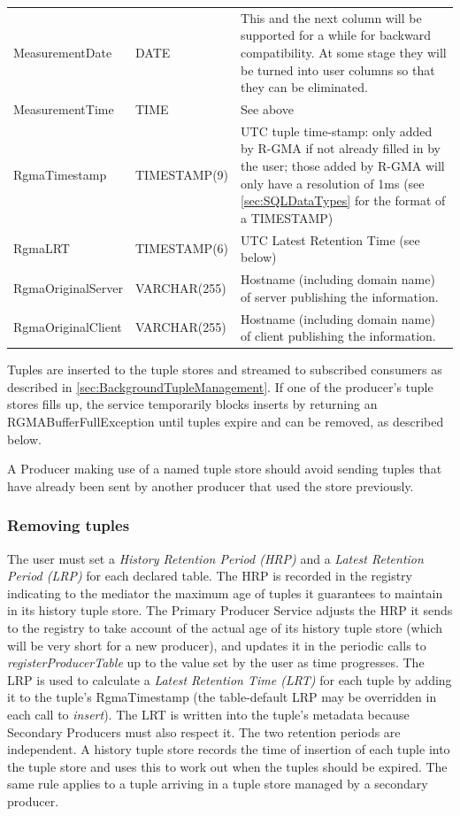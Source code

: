 \bigskip\begin{tabular}{llp{95mm}}
MeasurementDate&DATE&This and the next column will be supported for a while for
backward compatibility. At some stage they will be turned into user columns so
that they can be eliminated.\\
MeasurementTime&TIME&See above\\
RgmaTimestamp&TIMESTAMP(9)&
UTC tuple time-stamp: only added by R-GMA if not already filled in by the user;
those added by R-GMA will only have a resolution of 1ms
(see \ref{sec:SQLDataTypes} for the format of a TIMESTAMP)\\
RgmaLRT&TIMESTAMP(6)&
UTC Latest Retention Time (see below)\\
RgmaOriginalServer&VARCHAR(255)&
Hostname (including domain name) of server publishing the information.\\
RgmaOriginalClient&VARCHAR(255)&
Hostname (including domain name) of client publishing the information.\\
\end{tabular}\par\bigskip

Tuples are inserted to the tuple stores and streamed to subscribed consumers
as described in \ref{sec:BackgroundTupleManagement}. If one of the producer's
tuple stores fills up, the service temporarily blocks inserts by returning
an RGMABufferFullException until tuples expire and can be removed, as
described below.

A Producer making use of a named tuple store should avoid sending tuples that
have already been sent by another producer that used the store previously.

\subsubsection{Removing tuples}\label{sec:PrimaryProducerRemoving}

The user must set a \textit{History Retention Period (HRP)} and a 
\textit{Latest Retention Period (LRP)} for each declared table. The HRP is 
recorded in the registry indicating to the mediator the maximum age of tuples 
it guarantees to maintain in its history tuple store. The Primary Producer 
Service adjusts the HRP it sends to the registry to take account of the actual 
age of its history tuple store (which will be very short for a new producer), 
and updates it in the periodic calls to \textit{registerProducerTable} up to 
the value set by the user as time progresses. The LRP is used to calculate a \textit{Latest Retention Time 
(LRT)} for 
each tuple by adding it to the tuple's RgmaTimestamp (the table-default LRP may be 
overridden in each call to \textit{insert}). The LRT is written into the 
tuple's metadata because Secondary Producers must also respect it. The two 
retention periods are independent. A history tuple store records the time of
insertion of each tuple into the tuple store and uses this to work out when the
tuples should be expired. The same rule applies to a tuple arriving in a tuple
store managed by a secondary producer.

